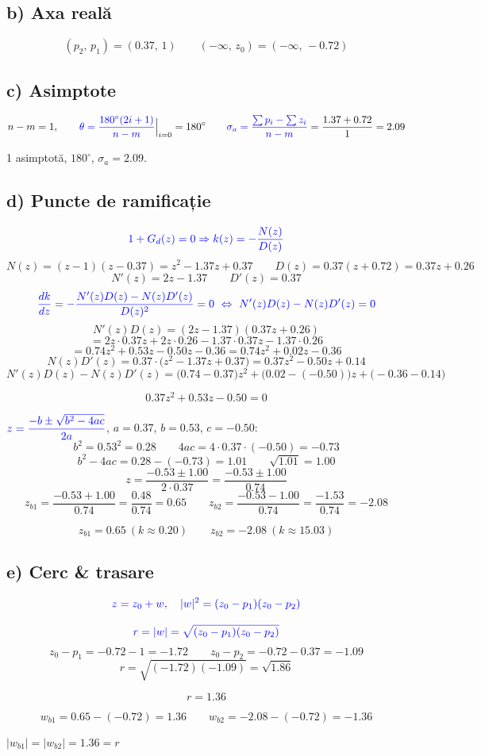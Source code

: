\documentclass[10pt,a4paper]{article}
\begin{document}
\subsection*{b) Axa reală}
\begin{res}
$$(p_2,\,p_1)=(0.37,\,1)\qquad(-\infty,\,z_0)=(-\infty,\,-0.72)$$
\end{res}

\subsection*{c) Asimptote}
$$n-m=1,\qquad \textcolor{blue}{\theta=\frac{180^\circ(2i+1)}{n-m}}\Big|_{i=0}=180^\circ\qquad
\textcolor{blue}{\sigma_a=\frac{\sum p_i-\sum z_i}{n-m}}=\frac{1.37+0.72}1=2.09$$
\begin{res}
1 asimptotă, $180^\circ$, $\sigma_a=2.09$.
\end{res}

\subsection*{d) Puncte de ramificație}
$$\color{blue}1+G_d(z)=0\Rightarrow k(z)=-\dfrac{N(z)}{D(z)}$$
$$N(z)=(z-1)(z-0.37)=z^2-1.37z+0.37\qquad D(z)=0.37(z+0.72)=0.37z+0.26$$
$$N'(z)=2z-1.37\qquad D'(z)=0.37$$
$$\color{blue}\frac{dk}{dz}=-\frac{N'(z)D(z)-N(z)D'(z)}{D(z)^2}=0\ \Leftrightarrow\ N'(z)D(z)-N(z)D'(z)=0$$
$$N'(z)D(z)=(2z-1.37)(0.37z+0.26)$$
$$=2z\cdot0.37z+2z\cdot0.26-1.37\cdot0.37z-1.37\cdot0.26$$
$$=0.74z^2+0.53z-0.50z-0.36=0.74z^2+0.02z-0.36$$
$$N(z)D'(z)=0.37\cdot\big(z^2-1.37z+0.37\big)=0.37z^2-0.50z+0.14$$
$$N'(z)D(z)-N(z)D'(z)=\big(0.74-0.37\big)z^2+\big(0.02-(-0.50)\big)z+\big(-0.36-0.14\big)$$
\begin{res}
$$0.37z^2+0.53z-0.50=0$$
\end{res}
$\textcolor{blue}{z=\dfrac{-b\pm\sqrt{b^2-4ac}}{2a}}$, $a=0.37$, $b=0.53$, $c=-0.50$:
$$b^2=0.53^2=0.28\qquad 4ac=4\cdot0.37\cdot(-0.50)=-0.73$$
$$b^2-4ac=0.28-(-0.73)=1.01\qquad \sqrt{1.01}=1.00$$
$$z=\frac{-0.53\pm1.00}{2\cdot0.37}=\frac{-0.53\pm1.00}{0.74}$$
$$z_{b1}=\frac{-0.53+1.00}{0.74}=\frac{0.48}{0.74}=0.65\qquad
z_{b2}=\frac{-0.53-1.00}{0.74}=\frac{-1.53}{0.74}=-2.08$$
\begin{res}
$$z_{b1}=0.65\ (k\approx0.20)\qquad z_{b2}=-2.08\ (k\approx15.03)$$
\end{res}

\subsection*{e) Cerc \& trasare}
\begin{res}
$$\color{blue}z=z_0+w,\quad |w|^2=(z_0-p_1)(z_0-p_2)$$
\end{res}
$$\color{blue}r=|w|=\sqrt{(z_0-p_1)(z_0-p_2)}$$
$$z_0-p_1=-0.72-1=-1.72\qquad z_0-p_2=-0.72-0.37=-1.09$$
$$r=\sqrt{(-1.72)(-1.09)}=\sqrt{1.86}$$
\begin{res}
$$r=1.36$$
\end{res}
$$w_{b1}=0.65-(-0.72)=1.36\qquad w_{b2}=-2.08-(-0.72)=-1.36$$
\begin{res}
$|w_{b1}|=|w_{b2}|=1.36=r$
\end{res}
\end{document}
